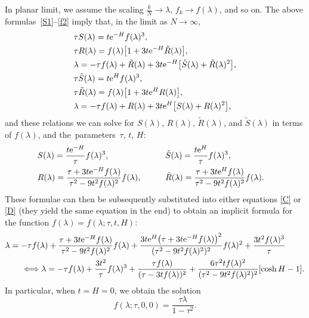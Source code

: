 \documentclass[pdftex]{sigma}
\numberwithin{equation}{section}
\begin{document}
In planar limit, we assume the scaling $\frac{k}{N} \to \lambda$, $f_k \to f(\lambda)$, and so on. The above formulas~\eqref{S1}--\eqref{f2} imply that, in the limit
as $N\to \infty$,
 \begin{align}
 &\tau S(\lambda)= t {\rm e}^{-H} f(\lambda)^3,\nonumber\\
 &\tau R(\lambda)= f(\lambda)\bigl[1 + 3t{\rm e}^{-H}\tilde{R}(\lambda)\bigr],\nonumber\\
 &\lambda= -\tau f(\lambda) + \tilde{R}(\lambda) + 3t{\rm e}^{-H}\bigl[\tilde{S}(\lambda) + \tilde{R}(\lambda)^2\bigr], \label{C}\\
 &\tau \tilde{S}(\lambda)= t {\rm e}^{H} f(\lambda)^3,\nonumber\\
 &\tau \tilde{R}(\lambda)= f(\lambda)\bigl[1 + 3t{\rm e}^{H}{R}(\lambda)\bigr],\nonumber\\
 &\lambda= -\tau f(\lambda) + {R}(\lambda) + 3t{\rm e}^{H}\bigl[S(\lambda) + R(\lambda)^2\bigr],\label{D}
 \end{align}
and these relations we can solve for $S(\lambda)$, $R(\lambda)$, $\tilde{R}(\lambda)$, and $\tilde{S}(\lambda)$ in terms of $f(\lambda)$,
and the~param\-e\-ters~$\tau$, $t$, $H$:
 \begin{alignat*}{3}
 &S(\lambda)= \frac{t{\rm e}^{-H}}{\tau} f(\lambda)^3,\qquad&& \tilde{S}(\lambda) = \frac{t{\rm e}^{H}}{\tau} f(\lambda)^3,&\\
 &R(\lambda)= \frac{\tau + 3t{\rm e}^{-H} f(\lambda)}{\tau^2 - 9t^2f(\lambda)^2}f(\lambda),\qquad&&
 \tilde{R}(\lambda) = \frac{\tau + 3t{\rm e}^{H} f(\lambda)}{\tau^2 - 9t^2f(\lambda)^2}f(\lambda).&
 \end{alignat*}
These formulae can then be subsequently substituted into either equations \eqref{C} or \eqref{D} (they yield the same equation in the end) to obtain an
implicit formula for the function $f(\lambda) = f(\lambda;\tau,t,H)$:
 \begin{align}
 &\lambda= -\tau f(\lambda) + \frac{\tau + 3t{\rm e}^{-H} f(\lambda)}{\tau^2 - 9t^2f(\lambda)^2}f(\lambda) + \frac{3t{\rm e}^{H}\bigl(\tau + 3t{\rm e}^{-H} f(\lambda)\bigr)^2}{(\tau^2 - 9t^2f(\lambda)^2)^2}f(\lambda)^2 + \frac{3t^2f(\lambda)^3}{\tau}\label{f-formula}\\
 &\qquad{}\Longleftrightarrow \lambda = -\tau f(\lambda) + \frac{3t^2}{\tau}f(\lambda)^3 + \frac{\tau f(\lambda)}{(\tau - 3tf(\lambda))^2}+\frac{6\tau^2tf(\lambda)^2}{(\tau^2-9t^2f(\lambda)^2)^2}[\cosh H -1].\nonumber
 \end{align}
In particular, when $t=H=0$, we obtain the solution
 \begin{equation*}
 f(\lambda;\tau,0,0) = \frac{\tau \lambda}{1-\tau^2}.
 \end{equation*}
\end{document}
